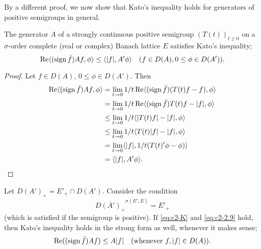 By a different proof, we now show that Kato's inequality holds for generators of positive semigroups in general.
\begin{theorem}\label{thm:c2-2.4}
%
%
%
The generator $A$ of a strongly continuous positive semigroup $(T(t))_{t \geq 0}$ on a $\sigma$-order complete (real or complex) Banach lattice $E$ satisfies Kato's inequality; \ie
\begin{equation*}\label{eq:c2-K-2} %
\Re\langle(\sign \bar{f})Af,\phi \rangle \leq \langle |f|,A'\phi \rangle \quad (f \in D(A), 0 \leq \phi \in D(A'))  .
\end{equation*}
\end{theorem}
\begin{proof}
Let $f \in D(A)$, $0 \leq \phi \in D(A')$.
Then
\begin{align*}
\mathop{}\!\mathrm{Re}\langle(\operatorname{sign} \bar{f})Af, \phi \rangle 
	&= \lim_{t \to 0} 1/t \mathop{}\!\mathrm{Re}\langle(\operatorname{sign} \bar{f})(T(t)f - f), \phi \rangle \\
	&= \lim_{t \to 0} 1/t \mathop{}\!\mathrm{Re}\langle(\operatorname{sign} \bar{f})T(t)f - |f|, \phi \rangle \\
	&\leq \lim_{t \to 0} 1/t \langle |T(t)f| - |f|, \phi \rangle \\
	&\leq \lim_{t \to 0} 1/t \langle T(t)|f| - |f|, \phi \rangle\\
	&= \lim_{t \to 0} \langle |f|, 1/t(T(t)'\phi - \phi) \rangle\\
	&= \langle |f|, A'\phi \rangle.
\end{align*}
\end{proof}
Let $D(A')_{+} = E'_{+} \cap D(A')$. 
Consider the condition
\begin{equation}\label{eq:c2-2.9}
\overline{D(A')_{+}}^{\sigma(E',E)} = E'_{+}
\end{equation}
(which is satisfied if the semigroup is positive). 
If \eqref{eq:c2-K}   and \eqref{eq:c2-2.9}   hold, then Kato's inequality holds in the strong form as well, whenever it makes sense; \ie
\begin{equation}\label{eq:c2-2.10}
\mathop{}\!\mathrm{Re}((\operatorname{sign} \bar{f})Af) \leq A|f| \quad \text{(whenever } f, |f| \in D(A)\text{)}.
\end{equation}
